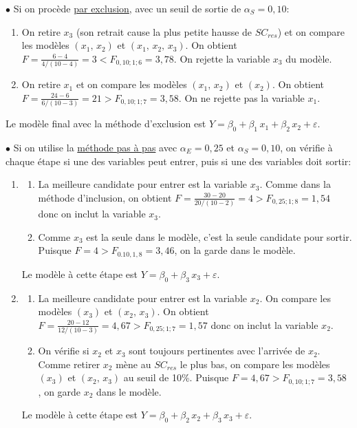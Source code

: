 \begin{exemple}
$\bullet$ Si on procède \underline{par exclusion}, avec un seuil de sortie de $\alpha_S=0,10$:
\begin{enumerate}
  \item On retire $x_3$ (son retrait cause la plus petite hausse de $SC_{res}$) et on compare les modèles $(x_1,\,x_2)$ et $(x_1,\,x_2,\,x_3)$. On obtient $F=\frac{6-4}{4/(10-4)}=3 < F_{0,10;1;6}=3,78$. On rejette la variable $x_3$ du modèle.
  \item On retire $x_1$ et on compare les modèles $(x_1,\,x_2)$ et $(x_2)$. On obtient $F=\frac{24-6}{6/(10-3)}=21>F_{0,10;1;7}=3,58$. On ne rejette pas la variable $x_1$.
\end{enumerate}

Le modèle final avec la  méthode d'exclusion est $Y=\beta_0+\beta_1\,x_1+\beta_2\,x_2 +\varepsilon$.

\newpage
$\bullet$ Si on utilise la \underline{méthode pas à pas} avec $\alpha_E=0,25$ et $\alpha_S=0,10$, on vérifie à chaque étape si une des variables peut entrer, puis si une des variables doit sortir:
    \begin{enumerate}
    \item
        \begin{enumerate}[$\bullet$]
        \item La meilleure candidate pour entrer est la variable $x_3$. Comme dans la méthode d'inclusion, on obtient $F=\frac{30-20}{20/(10-2)}=4>F_{0,25;1;8}=1,54$ donc on inclut la variable $x_3$.
        \item Comme $x_3$ est la seule dans le modèle, c'est la seule candidate pour sortir. Puisque $F=4> F_{0.10,1,8}=3,46$, on la garde dans le modèle.
        \end{enumerate}
         Le modèle à cette étape est $Y=\beta_0+\beta_3\,x_3+\varepsilon$.

    \item
        \begin{enumerate}[$\bullet$]
        \item La meilleure candidate pour entrer est la variable $x_2$. On compare les modèles $(x_3)$ et $(x_2,\,x_3)$. On obtient $F=\frac{20-12}{12/(10-3)}=4,67>F_{0,25;1;7}=1,57$ donc on inclut la variable $x_2$.
        \item On vérifie si $x_2$ et $x_3$ sont toujours pertinentes avec l'arrivée de $x_2$. Comme retirer $x_2$ mène au $SC_{res}$ le plus bas, on compare les modèles $(x_3)$ et $(x_2,\,x_3)$ au seuil de 10\%. Puisque $F=4,67>F_{0,10;1;7}=3,58$ , on garde $x_2$ dans le modèle.
        \end{enumerate}
        Le modèle à cette étape est $Y=\beta_0+\beta_2\,x_2+\beta_3\,x_3+\varepsilon$.


\end{enumerate}
\end{exemple}
